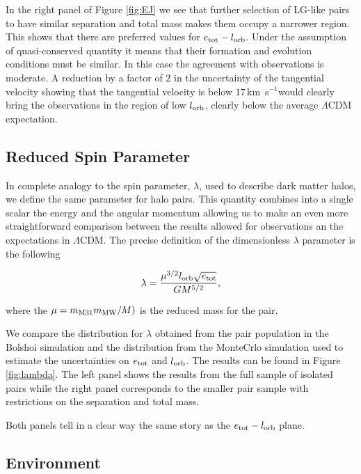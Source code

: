 \documentclass{emulateapj}
\newcommand{\kms}{\,km~s$^{-1}$}
\begin{document}
In the right panel of Figure \ref{fig:EJ} we see that further selection of LG-like pairs to have similar separation and total mass makes them occupy a narrower region. This shows that there are preferred values for $e_{\rm tot}-l_{\rm orb}$. Under the assumption of quasi-conserved quantity it means that their formation and evolution conditions must be similar. In this case the agreement with observations is moderate. A reduction by a factor of $2$ in the uncertainty of the tangential velocity showing that the tangential velocity is below $17$\kms would clearly bring the observations in the region of low $l_{\rm orb}$, clearly below the average $\Lambda$CDM expectation.

\subsection{Reduced Spin Parameter}

In complete analogy to the spin parameter, $\lambda$, used to describe dark matter halos, we define the same parameter for halo pairs. This quantity combines into a single scalar the energy and the angular momentum allowing us to make an even more straightforward comparison between the results allowed for observations an the expectations in $\Lambda$CDM. The precise definition of the dimensionless $\lambda$ parameter is the following


\begin{equation}
\lambda = \frac{\mu^{3/2} l_{\rm orb} \sqrt{e_{\rm tot}}}{G M^{5/2}}, 
\end{equation}

where the $\mu=m_{\rm M31}m_{\rm MW}/M)$ is the reduced mass for the pair.


We compare the distribution for  $\lambda$ obtained from the pair population in the Bolshoi simulation and the distribution from the MonteCrlo simulation used to estimate the uncertainties on $e_{\rm tot}$ and $l_{\rm orb}$. The results can be found in Figure \ref{fig:lambda}. The left panel shows the results from the full sample of isolated pairs while the right panel corresponds to the smaller pair sample with restrictions on the separation and total mass. 

Both panels tell in a clear way the same story as the $e_{\rm tot}-l_{\rm orb}$ plane.




\subsection{Environment}
\end{document}
